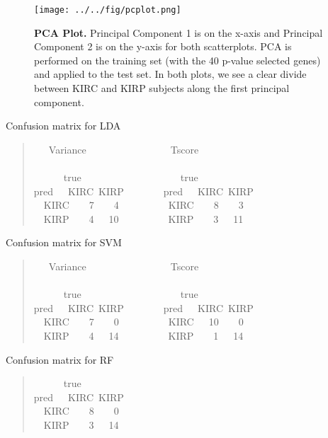 \begin{figure}[H]
  \centering
    \texttt{[image: ../../fig/pcplot.png]}

\caption{\textbf{PCA Plot.} Principal Component 1 is on the x-axis and Principal
  Component 2 is on the y-axis for both scatterplots.  PCA is performed on the
  training set (with the 40 p-value selected genes) and applied to the test set.
  In both plots, we see a clear divide between 	KIRC and KIRP subjects along
  the first principal component.}
   \label{fig:pca}
\end{figure}

Confusion matrix for LDA

\vspace*{\fill}
\begin{quote}{  \ttfamily \raggedright \noindent
\centering
~~~Variance~~~~~~~~~~~~~~~~~Tscore\\
~\\
~~~~~~true~~~~~~~~~~~~~~~~~~~~true\\
pred~~~KIRC~KIRP~~~~~~~~pred~~~KIRC~KIRP\\
~~KIRC~~~~7~~~~4~~~~~~~~~~KIRC~~~~8~~~~3\\
~~KIRP~~~~4~~~10~~~~~~~~~~KIRP~~~~3~~~11\\
}
\end{quote}
\vspace*{\fill}

Confusion matrix for SVM
\vspace*{\fill} 
\begin{quote}{ \ttfamily \raggedright \noindent
\centering
~~~Variance~~~~~~~~~~~~~~~~~Tscore\\
~\\
~~~~~~true~~~~~~~~~~~~~~~~~~~~true\\
pred~~~KIRC~KIRP~~~~~~~~pred~~~KIRC~KIRP\\
~~KIRC~~~~7~~~~0~~~~~~~~~~KIRC~~~10~~~~0\\
~~KIRP~~~~4~~~14~~~~~~~~~~KIRP~~~~1~~~14\\
}
\end{quote}
\vspace*{\fill}

Confusion matrix for RF
\vspace*{\fill}
\begin{quote}{ \ttfamily \raggedright \noindent
\centering
~~~~~~true\\
pred~~~KIRC~KIRP\\
~~KIRC~~~~8~~~~0\\
~~KIRP~~~~3~~~14\\
}
\end{quote}
\vspace*{\fill}






